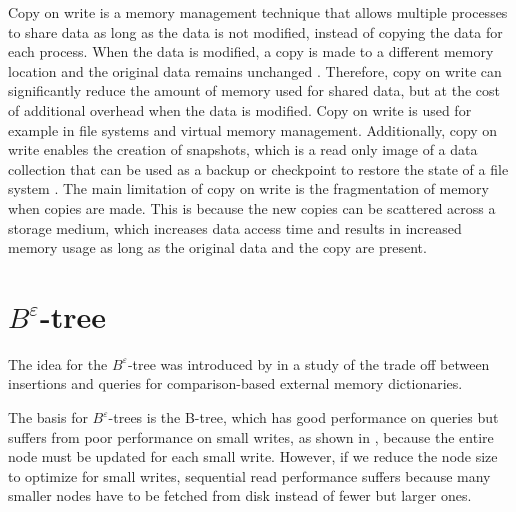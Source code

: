 \documentclass[
	12pt,
	a4paper,
	abstract,
	bibliography=totoc,
	chapterprefix,
	headings=openright,
	numbers=endperiod,
	parskip=half,
	twoside,
]{scrreprt}
\begin{document}
Copy on write is a memory management technique that allows multiple processes to 
share data as long as the data is not modified, instead of copying the data for each process. 
When the data is modified, a copy is made to a different memory location and 
the original data remains unchanged \cite{ha2022ccow}.
Therefore, copy on write can significantly reduce the amount of memory used for shared data, 
but at the cost of additional overhead when the data is modified.
Copy on write is used for example in file systems and virtual memory management.
Additionally, copy on write enables the creation of snapshots, which is a read only image of a 
data collection that can be used as a backup or checkpoint to restore the state of a file system \cite{peterson2002data}.
The main limitation of copy on write is the fragmentation of memory when copies are made.
This is because the new copies can be scattered across a storage medium, which increases data access time and 
results in increased memory usage as long as the original data and the copy are present.


\section{$B^{\varepsilon}$-tree}
\label{sec:tree}


The idea for the $B^{\varepsilon}$-tree was introduced by \cite{brodal2003lower} in a study of the trade off between insertions and queries for comparison-based external memory dictionaries.

The basis for $B^{\varepsilon}$-trees is the B-tree, which has good performance on queries but suffers from poor performance on small writes, as shown in \cite{bender2015introduction}, 
because the entire node must be updated for each small write.
However, if we reduce the node size to optimize for small writes, sequential read performance suffers because many smaller nodes have to be fetched from disk instead of fewer but larger ones.
\end{document}

